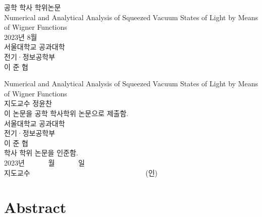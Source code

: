 \documentclass[10pt,a4paper]{report}
\def\papertitle{Numerical and Analytical Analysis of Squeezed Vacuum States of Light by Means of Wigner Functions} %
\def\paperdate{2023년 8월} %
\def\paperauthor{이준협} %
\def\paperauthorspaced{이 준 협}
\def\paperadvisor{정윤찬} %
\begin{document}
\renewcommand{\abstractname}{초~록}
\renewcommand{\figurename}{Figure}
\renewcommand{\contentsname}{Contents}
\renewcommand{\listtablename}{List of Tables}
\renewcommand{\listfigurename}{List of Figures}

\thispagestyle{empty} %
\begin{center}
    \fontsize{16pt}{19pt}\selectfont
    공학 학사 학위논문 \\
    \vspace{2cm}
    \fontsize{21pt}{25pt}\selectfont
    \papertitle \\
    \vfill
    \fontsize{16pt}{19pt}\selectfont
    \paperdate \\
    \vspace{4cm}
    서울대학교 공과대학 \\
    \vspace{1cm}
    전기·정보공학부 \\
    \vspace{1cm}
    \paperauthorspaced
\end{center}
\newpage

\thispagestyle{empty} %
\begin{center}
    \fontsize{21pt}{25pt}\selectfont
    \papertitle \\
    \vspace{1cm}
    \fontsize{16pt}{19pt}\selectfont
    지도교수 \paperadvisor \\
    \vspace{1cm}
    이 논문을 공학 학사학위 논문으로 제출함. \\
    \vfill
    서울대학교 공과대학 \\
    \vspace{1cm}
    전기·정보공학부 \\
    \paperauthorspaced \\
    \vspace{1cm}
     학사 학위 논문을 인준함. \\
    \vspace{1cm}
    2023년 ~~~~~~월 ~~~~~~일 \\
    \vspace{1cm}
    지도교수 ~~~~~~~~~~~~~~~~~~~~~~~~~~~~~~~~(인)
\end{center}
\newpage

\chapter*{Abstract}
\end{document}
